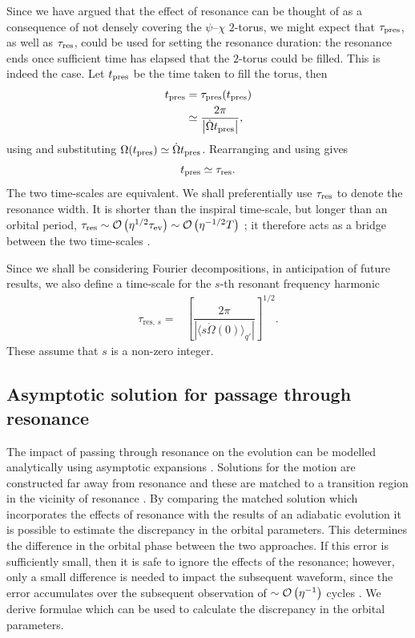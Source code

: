 Since we have argued that the effect of resonance can be thought of as a consequence of not densely covering the $\psi$--$\chi$ $2$-torus, we might expect that $\tau_\mathrm{pres}$, as well as $\tau_\mathrm{res}$, could be used for setting the resonance duration: the resonance ends once sufficient time has elapsed that the $2$-torus could be filled. This is indeed the case. Let $t_\mathrm{pres}$ be the time taken to fill the torus, then
\begin{align}
t_\mathrm{pres} = {} & \tau_\mathrm{pres}(t_\mathrm{pres}) \\
 \simeq {} & \dfrac{2\pi}{\left|\dot{\Omega}t_\mathrm{pres}\right|}, \nonumber 
\end{align}
using  and substituting $\Omega(t_\mathrm{pres}) \simeq \dot{\Omega}t_\mathrm{pres}$. Rearranging and using  gives
\begin{equation}
t_\mathrm{pres} \simeq \tau_\mathrm{res}.
\end{equation}
The two time-scales are equivalent. We shall preferentially use $\tau_\mathrm{res}$ to denote the resonance width. It is shorter than the inspiral time-scale, but longer than an orbital period, $\tau_\mathrm{res} \sim \mathcal{O}\left({\eta^{1/2}\tau_\mathrm{ev}}\right) \sim \mathcal{O}\left({\eta^{-1/2}T}\right)$ \citep{Flanagan2012,Gair2011a}; it therefore acts as a bridge between the two time-scales \citep{Hinderer2008}.

Since we shall be considering Fourier decompositions, in anticipation of future results, we also define a time-scale for the $s$-th resonant frequency harmonic
\begin{align}
\tau_{\mathrm{res},\,s} = {} & \left[\dfrac{2\pi}{\left|\langle s\dot{\Omega}(0)\rangle_{q'}\right|}\right]^{1/2}.
\label{eq:T-res-s}
\end{align}
These assume that $s$ is a non-zero integer.

\subsection{Asymptotic solution for passage through resonance}\label{sec:res-asymptotic}

The impact of passing through resonance on the evolution can be modelled analytically using asymptotic expansions \citep{Gair2012}. Solutions for the motion are constructed far away from resonance and these are matched to a transition region in the vicinity of resonance \citep{Kevorkian1971,Bosley1992}. By comparing the matched solution which incorporates the effects of resonance with the results of an adiabatic evolution it is possible to estimate the discrepancy in the orbital parameters. This determines the difference in the orbital phase between the two approaches. If this error is sufficiently small, then it is safe to ignore the effects of the resonance; however, only a small difference is needed to impact the subsequent waveform, since the error accumulates over the subsequent observation of $\sim \mathcal{O}\left({\eta^{-1}}\right)$ cycles \citep{Flanagan2012}. We derive formulae which can be used to calculate the discrepancy in the orbital parameters.

